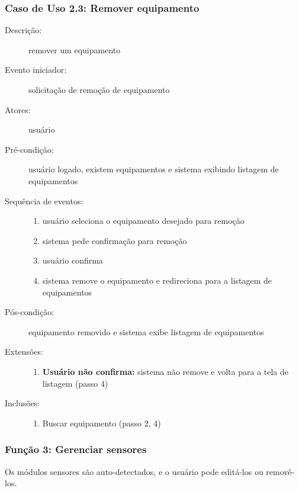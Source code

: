 \subsubsection{Caso de Uso 2.3: Remover equipamento}
\begin{description}
	\item[Descrição:] remover um equipamento
	\item[Evento iniciador:] solicitação de remoção de equipamento
	\item[Atores:] usuário
	\item[Pré-condição:] usuário logado, existem equipamentos e sistema exibindo listagem de equipamentos
	\item[Sequência de eventos:] \hfill
		\begin{enumerate}
			\item{usuário seleciona o equipamento desejado para remoção}
			\item{sistema pede confirmação para remoção}
			\item{usuário confirma}
			\item{sistema remove o equipamento e redireciona para a listagem de equipamentos}
		\end{enumerate}
	\item[Pós-condição:] equipamento removido e sistema exibe listagem de equipamentos
	\item[Extensões:] \hfill
		\begin{enumerate}
			\item{\textbf{Usuário não confirma:} sistema não remove e volta para a tela de listagem (passo 4)}
		\end{enumerate}
	\item[Inclusões:] \hfill
		\begin{enumerate}
			\item{Buscar equipamento (passo 2, 4)}
		\end{enumerate}
\end{description}
\subsubsection{Função 3: Gerenciar sensores}
Os módulos sensores são auto-detectados, e o usuário pode editá-los ou removê-los.
%
